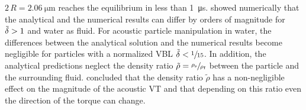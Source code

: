 $2\,R=\SI{2.06}{\um}$ reaches the equilibrium in less than 
\SI{1}{\micro\second}. \citeauthor{Hahn2016} \cite{Hahn2016} showed numerically 
that the analytical and the numerical results can differ by orders of magnitude 
for $\tilde{\delta} > 1$ and water as fluid. For acoustic particle manipulation in 
water, the differences between the analytical solution and the numerical results 
become negligible for particles with a normalized VBL 
$\tilde{\delta} < \sfrac{1}{15}$. In addition, the analytical predictions neglect 
the density ratio $\tilde{\rho} = \sfrac{\rho_{\text{s}}}{\rho_{\text{f}}}$ 
between the particle and the surrounding fluid.  \citeauthor{Hahn2016} 
\cite{Hahn2016} concluded that the density ratio $\tilde{\rho}$ has a 
non-negligible effect on the magnitude of the acoustic VT and that depending on 
this ratio even the direction of the torque can change.
